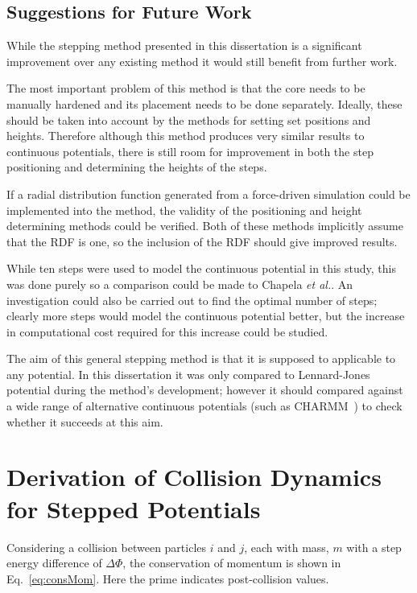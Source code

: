 \documentclass[12pt]{UoAthesis} \usepackage{booktabs}
\begin{document}
\section{Suggestions for Future Work}

While the stepping method presented in this dissertation is a
significant improvement over any existing method it would still
benefit from further work.

The most important problem of this method is that the core needs to
be manually hardened and its placement needs to be done separately.
Ideally, these should be taken into account by the methods for setting
set positions and heights.  Therefore although this method produces
very similar results to continuous potentials, there is still room for
improvement in both the step positioning and determining the heights
of the steps.  

If a radial distribution function generated from a force-driven
simulation could be implemented into the method, the validity of the
positioning and height determining methods could be verified.  Both of
these methods implicitly assume that the RDF is one, so the inclusion
of the RDF should give improved results.

While ten steps were used to model the continuous potential in this
study, this was done purely so a comparison could be made to Chapela
\textit{et al.}.  An investigation could also be carried out to find
the optimal number of steps; clearly more steps would model the
continuous potential better, but the increase in computational cost
required for this increase could be studied.

The aim of this general stepping method is that it is supposed to
applicable to any potential.  In this dissertation it was only
compared to Lennard-Jones potential during the method's development;
however it should compared against a wide range of alternative
continuous potentials (such as CHARMM~\cite{MacKerell1998}) to check
whether it succeeds at this aim.
\printbibliography[heading=thesisChapterBib] 
\appendix
\chapter{Derivation of Collision Dynamics for Stepped Potentials }
\label{app:derivation}
Considering a collision between particles $i$ and $j$, each with mass,
$m$ with a step energy difference of $\Delta \Phi$, the conservation of
momentum is shown in Eq.~\eqref{eq:consMom}. Here the prime
indicates post-collision values.
\end{document}
